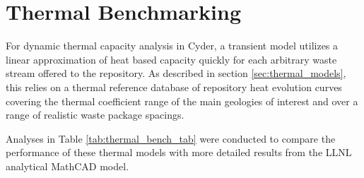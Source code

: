 \section{Thermal Benchmarking} \label{sec:thermal_benchmarking}



For dynamic thermal capacity analysis in Cyder, a transient model utilizes a 
linear approximation of heat based capacity quickly for each arbitrary waste 
stream offered to the repository. As described in section 
\ref{sec:thermal_models}, this relies on a thermal reference database 
of repository heat evolution curves covering the thermal coefficient range of 
the main geologies of interest and over a range of realistic waste package 
spacings. 

Analyses in Table \ref{tab:thermal_bench_tab} were conducted to compare the 
performance of these thermal models with more detailed results from the 
\gls{LLNL} analytical MathCAD model.

